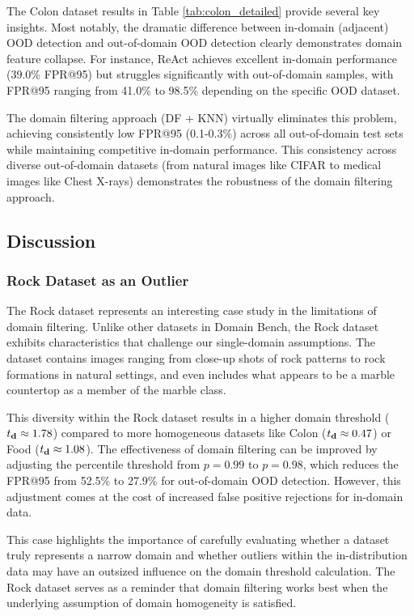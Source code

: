 \documentclass[11pt, oneside]{book}
\theoremstyle{plain}
\theoremstyle{definition}
\theoremstyle{remark}
\begin{document}
The Colon dataset results in Table \ref{tab:colon_detailed} provide several key insights. Most notably, the dramatic difference between in-domain (adjacent) OOD detection and out-of-domain OOD detection clearly demonstrates domain feature collapse. For instance, ReAct achieves excellent in-domain performance (39.0\% FPR@95) but struggles significantly with out-of-domain samples, with FPR@95 ranging from 41.0\% to 98.5\% depending on the specific OOD dataset.

The domain filtering approach (DF + KNN) virtually eliminates this problem, achieving consistently low FPR@95 (0.1-0.3\%) across all out-of-domain test sets while maintaining competitive in-domain performance. This consistency across diverse out-of-domain datasets (from natural images like CIFAR to medical images like Chest X-rays) demonstrates the robustness of the domain filtering approach.

\subsection{Discussion}
\label{discussion}

\subsubsection{Rock Dataset as an Outlier}

The Rock dataset \citep{rock_data} represents an interesting case study in the limitations of domain filtering. Unlike other datasets in Domain Bench, the Rock dataset exhibits characteristics that challenge our single-domain assumptions. The dataset contains images ranging from close-up shots of rock patterns to rock formations in natural settings, and even includes what appears to be a marble countertop as a member of the marble class.

This diversity within the Rock dataset results in a higher domain threshold ($t_{\mathbf{d}} \approx 1.78$) compared to more homogeneous datasets like Colon ($t_{\mathbf{d}} \approx 0.47$) or Food ($t_{\mathbf{d}} \approx 1.08$). The effectiveness of domain filtering can be improved by adjusting the percentile threshold from $p=0.99$ to $p=0.98$, which reduces the FPR@95 from 52.5\% to 27.9\% for out-of-domain OOD detection. However, this adjustment comes at the cost of increased false positive rejections for in-domain data.

This case highlights the importance of carefully evaluating whether a dataset truly represents a narrow domain and whether outliers within the in-distribution data may have an outsized influence on the domain threshold calculation. The Rock dataset serves as a reminder that domain filtering works best when the underlying assumption of domain homogeneity is satisfied.
\end{document}
